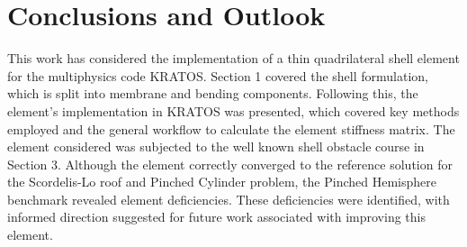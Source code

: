 
\chapter{Conclusions and Outlook}
\label{chap:conclusions}
\renewcommand{\Thema}{Conclusion}

This work has considered the implementation of a thin quadrilateral shell element for the multiphysics code KRATOS. Section 1 covered the shell formulation, which is split into membrane and bending components. Following this, the element's implementation in KRATOS was presented, which covered key methods employed and the general workflow to calculate the element stiffness matrix. The element considered was subjected to the well known shell obstacle course in Section 3. Although the element correctly converged to the reference solution for the Scordelis-Lo roof and Pinched Cylinder problem, the Pinched Hemisphere benchmark revealed element deficiencies. These deficiencies were identified, with informed direction suggested  for future work associated with improving this element. 
